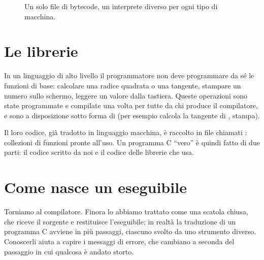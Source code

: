 \begin{figure}[H]
  \centering
  \caption{Un solo file di bytecode, un interprete diverso per ogni tipo di
           macchina.}
  \label{fig:bytecode}
\end{figure}

\section{Le librerie}

In un linguaggio di alto livello il programmatore non deve programmare da sé
le funzioni di base: calcolare una radice quadrata o una tangente, stampare
un numero sullo schermo, leggere un valore dalla tastiera. Queste operazioni
sono state programmate e compilate una volta per tutte da chi produce il
compilatore, e sono a disposizione sotto forma di  (per
esempio  calcola la tangente di ,  stampa).

Il loro codice, già tradotto in linguaggio macchina, è raccolto in file
chiamati : collezioni di funzioni pronte all'uso. Un
programma C “vero” è quindi fatto di due parti: il codice scritto da noi
e il codice delle librerie che usa.

\section{Come nasce un eseguibile}

Torniamo al compilatore. Finora lo abbiamo trattato come una scatola
chiusa, che riceve il sorgente e restituisce l'eseguibile; in realtà la
traduzione di un programma C avviene in più passaggi, ciascuno svolto da uno
strumento diverso. Conoscerli aiuta a capire i messaggi di errore, che
cambiano a seconda del passaggio in cui qualcosa è andato storto.

